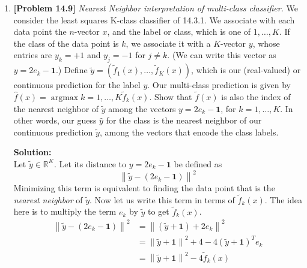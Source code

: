 \begin{enumerate}[label=(\alph*)]
	\item \textbf{[Problem 14.9]} \textit{Nearest Neighbor interpretation of
		      multi-class classifier.} We consider the least squares K-class
	      classifier of 14.3.1. We associate with each data point the $n$-vector
	      $x$, and the label or class, which is one of $1, \ldots, K$. If the
	      class of the data point is $k$, we associate it with a $K$-vector $y$,
	      whose entries are $y_k = +1$ and $y_j = -1$ for $j \neq k$. (We can
	      write this vector as $y = 2e_k - \mathbf{1}$.) Define $\tilde{y} =
		      ( \tilde{f}_1(x), \ldots, \tilde{f}_K(x) )$, which is
	      our (real-valued) or continuous prediction for the label $y$. Our
	      multi-class prediction is given by $\hat{f}(x) = \operatorname{argmax}{k =
			      1,\ldots,K} \tilde{f}_k(x)$. Show that $\tilde{f}(x)$ is also the
	      index of the nearest neighbor of $\tilde{y}$ among the vectors
	      $y = 2e_k - \mathbf{1}$, for $k = 1, \ldots, K$. In other words, our
	      guess $\hat{y}$ for the class is the nearest neighbor of our
	      continuous prediction $\tilde{y}$, among the vectors that encode the
	      class labels.

	      \begin{tcolorbox}
		      \textbf{Solution:} \\
		      Let $\tilde{y} \in \mathbb{R}^K$.  Let its distance to $y = 2e_k -
			      \mathbf{1}$ be defined as
		      $$ \left\| \tilde{y} - \left( 2e_k - \mathbf{1} \right) \right\|^2$$
		      Minimizing this term is equivalent to finding the data point that
		      is the \textit{nearest neighbor} of $\tilde{y}$. Now let us write
		      this term in terms of $\tilde{f}_k(x)$. The idea here is to
		      multiply the term $e_k$ by $\tilde{y}$ to get $\tilde{f}_k(x)$.
		      $$ \begin{aligned}
				      \left\| \tilde{y} - \left( 2e_k - \mathbf{1} \right)
				      \right\|^2 & =
				      \left\| \left(\tilde{y} + \mathbf{1} \right) + 2e_k
				      \right\|^2                                                 \\
				                 & = \left\| \tilde{y} + \mathbf{1} \right\|^2 +
				      4 - 4\left( \tilde{y} + \mathbf{1}
				      \right)^Te_k                                               \\
				                 & = \left\| \tilde{y} + \mathbf{1} \right\|^2 -
				      4\tilde{f}_k(x)                                            \\
			      \end{aligned}$$


\end{tcolorbox}
\end{enumerate}
